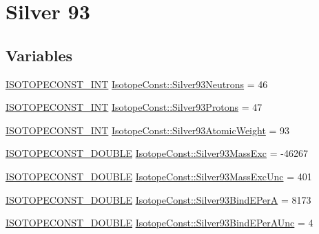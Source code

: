 \hypertarget{group___isotope_const-_silver-_ag93}{}\section{Silver 93}
\label{group___isotope_const-_silver-_ag93}
\subsection*{Variables}
\begin{DoxyCompactItemize}
\item 
\mbox{\hyperlink{group___isotope_const-_macros_ga5f18360b3e99483a35c32d789e62621c}{I\+S\+O\+T\+O\+P\+E\+C\+O\+N\+S\+T\+\_\+\+I\+NT}} \mbox{\hyperlink{group___isotope_const-_silver-_ag93_gac3f70b5f29c69863099dc9c34214051d}{Isotope\+Const\+::\+Silver93\+Neutrons}} = 46
\item 
\mbox{\hyperlink{group___isotope_const-_macros_ga5f18360b3e99483a35c32d789e62621c}{I\+S\+O\+T\+O\+P\+E\+C\+O\+N\+S\+T\+\_\+\+I\+NT}} \mbox{\hyperlink{group___isotope_const-_silver-_ag93_ga20bc406972eeec35b0e2ea1c9bd510ef}{Isotope\+Const\+::\+Silver93\+Protons}} = 47
\item 
\mbox{\hyperlink{group___isotope_const-_macros_ga5f18360b3e99483a35c32d789e62621c}{I\+S\+O\+T\+O\+P\+E\+C\+O\+N\+S\+T\+\_\+\+I\+NT}} \mbox{\hyperlink{group___isotope_const-_silver-_ag93_ga4c9f5e3e8495a991b6198100da103b2d}{Isotope\+Const\+::\+Silver93\+Atomic\+Weight}} = 93
\item 
\mbox{\hyperlink{group___isotope_const-_macros_ga8f45a7272ce02c0b4c65c44636ed719a}{I\+S\+O\+T\+O\+P\+E\+C\+O\+N\+S\+T\+\_\+\+D\+O\+U\+B\+LE}} \mbox{\hyperlink{group___isotope_const-_silver-_ag93_ga3a9fd09e7885fd458ecd348ccd31b3c0}{Isotope\+Const\+::\+Silver93\+Mass\+Exc}} = -\/46267
\item 
\mbox{\hyperlink{group___isotope_const-_macros_ga8f45a7272ce02c0b4c65c44636ed719a}{I\+S\+O\+T\+O\+P\+E\+C\+O\+N\+S\+T\+\_\+\+D\+O\+U\+B\+LE}} \mbox{\hyperlink{group___isotope_const-_silver-_ag93_gaacc17a307a8e547c6e974df65560539f}{Isotope\+Const\+::\+Silver93\+Mass\+Exc\+Unc}} = 401
\item 
\mbox{\hyperlink{group___isotope_const-_macros_ga8f45a7272ce02c0b4c65c44636ed719a}{I\+S\+O\+T\+O\+P\+E\+C\+O\+N\+S\+T\+\_\+\+D\+O\+U\+B\+LE}} \mbox{\hyperlink{group___isotope_const-_silver-_ag93_ga24f4826bc7eb833acb0fc855f1fb3e2a}{Isotope\+Const\+::\+Silver93\+Bind\+E\+PerA}} = 8173
\item 
\mbox{\hyperlink{group___isotope_const-_macros_ga8f45a7272ce02c0b4c65c44636ed719a}{I\+S\+O\+T\+O\+P\+E\+C\+O\+N\+S\+T\+\_\+\+D\+O\+U\+B\+LE}} \mbox{\hyperlink{group___isotope_const-_silver-_ag93_gabd24eb17419cd163fc571e77ca48e912}{Isotope\+Const\+::\+Silver93\+Bind\+E\+Per\+A\+Unc}} = 4

\end{DoxyCompactItemize}
